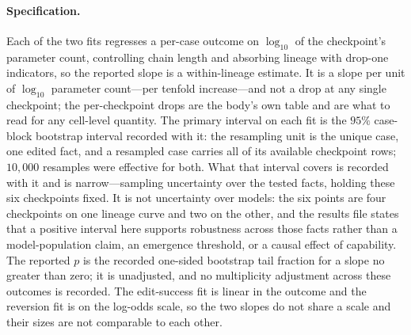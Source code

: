 \documentclass[letterpaper]{article}
\begin{document}
\paragraph{Specification.}  Each of the two fits regresses a per-case outcome on
\(\log_{10}\) of the checkpoint's parameter count, controlling chain length and
absorbing lineage with drop-one indicators, so the reported slope is a
within-lineage estimate.  It is a slope per unit of \(\log_{10}\) parameter
count---per tenfold increase---and not a drop at any single checkpoint; the
per-checkpoint drops are the body's own table and are what to read for any
cell-level quantity.  The primary interval on each fit is the \(95\%\)
case-block bootstrap interval recorded with it: the resampling unit is the
unique case, one edited fact, and a resampled case carries all of its available
checkpoint rows; \(10{,}000\) resamples were effective for both.  What that
interval covers is recorded with it and is narrow---sampling uncertainty over
the tested facts, holding these six checkpoints fixed.  It is not uncertainty
over models: the six points are four checkpoints on one lineage curve and two on
the other, and the results file states that a positive interval here supports
robustness across those facts rather than a model-population claim, an emergence
threshold, or a causal effect of capability.  The reported \(p\) is the recorded
one-sided bootstrap tail fraction for a slope no greater than zero; it is
unadjusted, and no multiplicity adjustment across these outcomes is recorded.
The edit-success fit is linear in the outcome and the reversion fit is on the
log-odds scale, so the two slopes do not share a scale and their sizes are not
comparable to each other.
\end{document}

